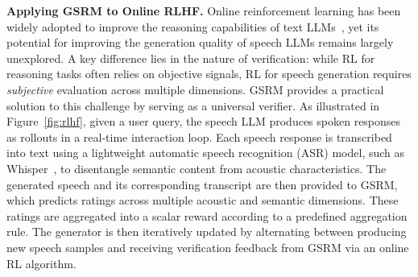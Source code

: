 \textbf{Applying GSRM to Online RLHF.} Online reinforcement learning has been widely adopted to improve the reasoning capabilities of text LLMs~\cite{zha2025rl,shen2025satori,guo2025deepseek}, yet its potential for improving the generation quality of speech LLMs remains largely unexplored. A key difference lies in the nature of verification: while RL for reasoning tasks often relies on objective signals, RL for speech generation requires \emph{subjective} evaluation across multiple dimensions. GSRM provides a practical solution to this challenge by serving as a universal verifier. As illustrated in Figure~\ref{fig:rlhf}, given a user query, the speech LLM produces spoken responses as rollouts in a real-time interaction loop. Each speech response is transcribed into text using a lightweight automatic speech recognition (ASR) model, such as Whisper~\cite{radford2023robust}, to disentangle semantic content from acoustic characteristics. The generated speech and its corresponding transcript are then provided to GSRM, which predicts ratings across multiple acoustic and semantic dimensions. These ratings are aggregated into a scalar reward according to a predefined aggregation rule. The generator is then iteratively updated by alternating between producing new speech samples and receiving verification feedback from GSRM via an online RL algorithm.
